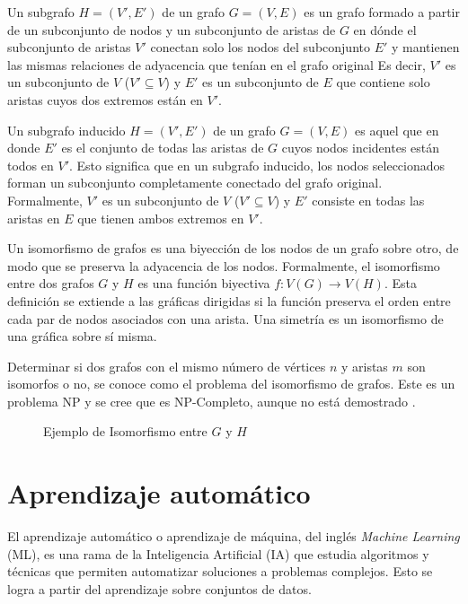 Un subgrafo $H = (V', E')$ de un grafo $G = (V, E)$ es un grafo formado a partir de un subconjunto de nodos y un subconjunto de aristas de $G$ en dónde el subconjunto de aristas $V'$ conectan solo los nodos del subconjunto $E'$ y mantienen las mismas relaciones de adyacencia que tenían en el grafo original
Es decir, $V'$ es un subconjunto de $V$ ($V' \subseteq V$) y $E'$ es un subconjunto de $E$ que contiene solo aristas cuyos dos extremos están en $V'$.

Un subgrafo inducido $H = (V', E')$ de un grafo $G = (V, E)$ es aquel que en donde $E'$ es el conjunto de todas las aristas de $G$ cuyos nodos incidentes están todos en $V'$. Esto significa que en un subgrafo inducido, los nodos seleccionados forman un subconjunto completamente conectado del grafo original. Formalmente, $V'$ es un subconjunto de $V$ ($V' \subseteq V$) y $E'$ consiste en todas las aristas en $E$ que tienen ambos extremos en $V'$. 

Un isomorfismo de grafos es una biyección de los nodos de un grafo sobre otro, de modo que se preserva la adyacencia de los nodos. Formalmente, el isomorfismo entre dos grafos $G$ y $H$ es una función biyectiva  $f:V(G) \rightarrow V(H)$. Esta definición se extiende a las gráficas dirigidas si la función preserva el orden entre cada par de nodos asociados con una arista. Una simetría es un isomorfismo de una gráfica sobre sí misma.

Determinar si dos grafos con el mismo número de vértices $n$ y aristas $m$ son isomorfos o no, se conoce como el problema del isomorfismo de grafos. Este es un problema NP y se cree que es NP-Completo, aunque no está demostrado \cite{kobler_graph_1993}.

\label{subsection:isomorphism}

 \begin{figure}[htbp]
   \centering
   
    \caption{Ejemplo de Isomorfismo entre $G$ y $H$}
    \label{fig:isomorphism}
\end{figure}


\section{Aprendizaje automático}
\label{sec:ML}

El aprendizaje automático o aprendizaje de máquina, del inglés \textit{Machine Learning} (ML), es una rama de la Inteligencia Artificial (IA) que estudia algoritmos y técnicas que permiten automatizar soluciones a problemas complejos. Esto se logra a partir del aprendizaje sobre conjuntos de datos. 


